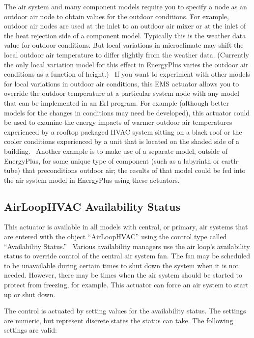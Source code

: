 The air system and many component models require you to specify a node as an outdoor air node to obtain values for the outdoor conditions. For example, outdoor air nodes are used at the inlet to an outdoor air mixer or at the inlet of the heat rejection side of a component model. Typically this is the weather data value for outdoor conditions. But local variations in microclimate may shift the local outdoor air temperature to differ slightly from the weather data. (Currently the only local variation model for this effect in EnergyPlus varies the outdoor air conditions as a function of height.)~ If you want to experiment with other models for local variations in outdoor air conditions, this EMS actuator allows you to override the outdoor temperature at a particular system node with any model that can be implemented in an Erl program. For example (although better models for the changes in conditions may need be developed), this actuator could be used to examine the energy impacts of warmer outdoor air temperatures experienced by a rooftop packaged HVAC system sitting on a black roof or the cooler conditions experienced by a unit that is located on the shaded side of a building.~ Another example is to make use of a separate model, outside of EnergyPlus, for some unique type of component (such as a labyrinth or earth-tube) that preconditions outdoor air; the results of that model could be fed into the air system model in EnergyPlus using these actuators.

\subsection{AirLoopHVAC Availability Status}\label{airloophvac-availability-status}

This actuator is available in all models with central, or primary, air systems that are entered with the object ``AirLoopHVAC'' using the control type called ``Availability Status.''~ Various availability managers use the air loop's availability status to override control of the central air system fan. The fan may be scheduled to be unavailable during certain times to shut down the system when it is not needed. However, there may be times when the air system should be started to protect from freezing, for example. This actuator can force an air system to start up or shut down.

The control is actuated by setting values for the availability status. The settings are numeric, but represent discrete states the status can take. The following settings are valid:

